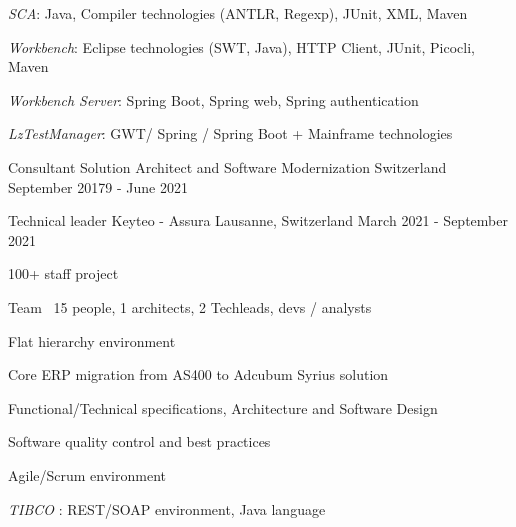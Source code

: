 \begin{cventries}
{{\begin{cvitems}
                    \item{\emph{SCA}: Java, Compiler technologies (ANTLR, Regexp), JUnit, XML, Maven}
                    \item{\emph{Workbench}: Eclipse technologies (SWT, Java), HTTP Client, JUnit, Picocli, Maven}
                    \item{\emph{Workbench Server}: Spring Boot, Spring web, Spring authentication}
                    \item{\emph{LzTestManager}: GWT/ Spring / Spring Boot + Mainframe technologies}
                \end{cvitems}
            }            
    }

    \cventry
    {Consultant} %
    {Solution Architect and Software Modernization} %
    {Switzerland} %
    {September 20179 - June 2021} %
    {}%

    \cventry
    {Technical leader} %
    {Keyteo - Assura} %
    {Lausanne, Switzerland} %
    {March 2021 - September 2021} %
    {
        \experience
        {
        \begin{cvitems} %
            \item{100+ staff project}
            \item{Team ~15 people, 1 architects, 2 Techleads, devs / analysts}
            \item{Flat hierarchy environment}
            \item{Core ERP migration from AS400 to Adcubum Syrius solution}
        \end{cvitems}
        }
        {
        \begin{cvitems} %
            \item{Functional/Technical specifications, Architecture and Software Design}
            \item{Software quality control and best practices}
            \item{Agile/Scrum environment}
        \end{cvitems}
        }
        {
        \begin{cvitems} %
            \item{\emph{TIBCO} : REST/SOAP environment, Java language}
        \end{cvitems}
        }
    }
    

\end{cventries}
